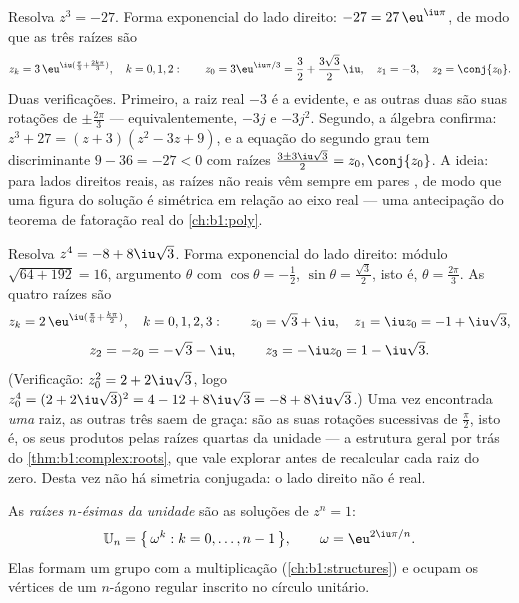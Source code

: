 \begin{example}\label{ex:b1:complex:cuberoots}
Resolva $z^3 = -27$. Forma exponencial do lado direito: $-27 =
27\,\eu^{\iu\pi}$, de modo que as três raízes são
\[
z_k = 3\,\eu^{\iu(\frac\pi3 + \frac{2k\pi}3)}, \quad k = 0, 1, 2 :
\qquad
z_0 = 3\eu^{\iu\pi/3} = \frac32 + \frac{3\sqrt3}2\,\iu,
\quad
z_1 = -3,
\quad
z_2 = \conj{z_0} .
\]
Duas verificações. Primeiro, a raiz real $-3$ é a evidente, e as
outras duas são suas rotações de $\pm\frac{2\pi}3$ --- equivalentemente,
$-3j$ e $-3j^2$. Segundo, a álgebra confirma: $z^3 + 27 = (z +
3)(z^2 - 3z + 9)$, e a equação do segundo grau tem discriminante $9 - 36 =
-27 < 0$ com raízes $\frac{3 \pm 3\iu\sqrt3}2 = z_0, \conj{z_0}$.
A ideia: para lados direitos reais, as raízes não reais vêm sempre
em pares , de modo que uma figura do  solução é
simétrica em relação ao eixo real --- uma antecipação do teorema de
fatoração real do \cref{ch:b1:poly}.
\end{example}

\begin{example}\label{ex:b1:complex:fourthroots}
Resolva $z^4 = -8 + 8\iu\sqrt3$. Forma exponencial do lado direito:
módulo $\sqrt{64 + 192} = 16$, argumento $\theta$ com
$\cos\theta = -\frac12$, $\sin\theta = \frac{\sqrt3}2$, isto é,
$\theta = \frac{2\pi}3$. As quatro raízes são
\[
z_k = 2\,\eu^{\iu(\frac\pi6 + \frac{k\pi}2)}, \quad k = 0, 1, 2,
3 :
\qquad
z_0 = \sqrt3 + \iu,\quad z_1 = \iu z_0 = -1 + \iu\sqrt3,
\]
\[
z_2 = -z_0 = -\sqrt3 - \iu,\qquad z_3 = -\iu z_0 = 1 - \iu\sqrt3 .
\]
(Verificação: $z_0^2 = 2 + 2\iu\sqrt3$, logo $z_0^4 = (2 +
2\iu\sqrt3)^2 = 4 - 12 + 8\iu\sqrt3 = -8 + 8\iu\sqrt3$.) Uma vez encontrada
\emph{uma} raiz, as outras três saem de graça: são as suas
rotações sucessivas de $\frac\pi2$, isto é, os seus produtos pelas
raízes quartas da unidade --- a estrutura geral por trás do
\cref{thm:b1:complex:roots}, que vale explorar antes de recalcular
cada raiz do zero. Desta vez não há simetria conjugada: o
lado direito não é real.
\end{example}

\begin{definition}\label{def:b1:complex:unity}
As \emph{raízes $n$-ésimas da unidade} são as
soluções de $z^n = 1$:
\[
\mathbb{U}_n = \bigl\{\, \omega^k : k = 0, \dots, n-1 \,\bigr\},
\qquad \omega = \eu^{2\iu\pi/n}.
\]
Elas formam um grupo com a multiplicação (\cref{ch:b1:structures}) e
ocupam os vértices de um $n$-ágono regular inscrito no círculo unitário.
\end{definition}

